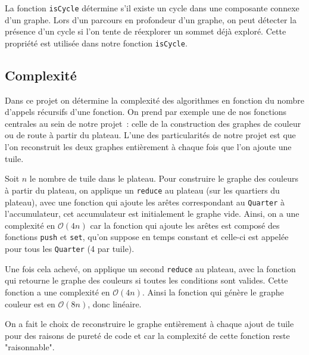 La fonction \texttt{isCycle} détermine s'il existe un cycle dans une composante connexe d'un graphe. Lors d'un parcours en profondeur d'un graphe, on peut détecter la présence d'un cycle si l'on tente de réexplorer un sommet déjà exploré. Cette propriété est utilisée dans notre fonction \texttt{isCycle}.

\subsection{Complexité}
Dans ce projet on détermine la complexité des algorithmes en fonction du nombre d'appels récursifs d'une fonction. On prend par exemple une de nos fonctions centrales au sein de notre projet~: celle de la construction des graphes de couleur ou de route à partir du plateau. L'une des particularités de notre projet est que l'on reconstruit les deux graphes entièrement à chaque fois que l'on ajoute une tuile.

Soit $n$ le nombre de tuile dans le plateau. Pour construire le graphe des couleurs à partir du plateau, on applique un \texttt{reduce} au plateau (sur les quartiers du plateau), avec une fonction qui ajoute les arêtes correspondant au \texttt{Quarter} à l'accumulateur, cet accumulateur est initialement le graphe vide. Ainsi, on a une complexité en $\mathcal{O}(4n)$ car la fonction qui ajoute les arêtes est composé des fonctions \texttt{push} et \texttt{set}, qu'on suppose en temps constant et celle-ci est appelée pour tous les \texttt{Quarter} (4 par tuile).

Une fois cela achevé, on applique un second \texttt{reduce} au plateau, avec la fonction qui retourne le graphe des couleurs si toutes les conditions sont valides. Cette fonction a une complexité en $\mathcal{O}(4n)$. Ainsi la fonction qui génère le graphe couleur est en $\mathcal{O}(8n)$, donc linéaire.

On a fait le choix de reconstruire le graphe entièrement à chaque ajout de tuile pour des raisons de pureté de code et car la complexité de cette fonction reste "raisonnable".

